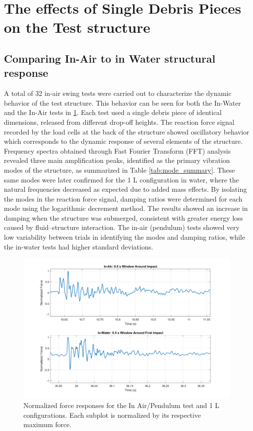 \documentclass{article}
\begin{document}
{\begin{figure}[htbp]
\end{figure}

\section{The effects of Single Debris Pieces on the Test structure} 
\subsection{Comparing In-Air to in Water structural response} 
A total of 32 in-air swing tests were carried out to characterize the dynamic behavior of the test structure. This behavior can be seen for both the In-Water and the In-Air tests in \ref{fig:normalized_forces_structure}. Each test used a single debris piece of identical dimensions, released from different drop-off heights. The reaction force signal recorded by the load cells at the back of the structure showed oscillatory behavior which corresponds to the dynamic response of several elements of the structure. Frequency spectra obtained through Fast Fourier Transform (FFT) analysis revealed three main amplification peaks, identified as the primary vibration modes of the structure, as summarized in Table \ref{tab:mode_summary}. These same modes were later confirmed for the 1 L configuration in water, where the natural frequencies decreased as expected due to added mass effects. By isolating the modes in the reaction force signal, damping ratios were determined for each mode using the logarithmic decrement method. The results showed an increase in damping when the structure was submerged, consistent with greater energy loss caused by fluid–structure interaction. The in-air (pendulum) tests showed very low variability between trials in identifying the modes and damping ratios, while the in-water tests had higher standard deviations.


\begin{figure}[ht]
    \centering
    \includegraphics[width=\linewidth]{figures/plot_normalized_forces_in_air_vs_in_water_zoom.png}
    \caption{Normalized force responses for the In Air/Pendulum test and 1 L configurations. Each subplot is normalized by its respective maximum force.}
    \label{fig:normalized_forces_structure}
\end{figure}


}
\end{document}
